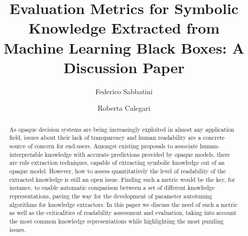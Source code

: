 \documentclass[sigconf]{acmart}
\begin{document}
\title{Evaluation Metrics for Symbolic Knowledge Extracted from Machine Learning Black Boxes: A Discussion Paper}

\author{Federico Sabbatini}

\author{Roberta Calegari}

\renewcommand{\shortauthors}{F. Sabbatini, R. Calegari}

\begin{abstract}
  As opaque decision systems are being increasingly exploited in almost any application field, issues about their lack of transparency and human readability are a concrete source of concern for end-users.
  Amongst existing proposals to associate human-interpretable knowledge with accurate predictions provided by opaque models, there are rule extraction techniques, capable of extracting symbolic knowledge out of an opaque model.
  However, how to assess quantitatively the level of readability of the extracted knowledge is still an open issue.
  Finding such a metric would be the key, for instance, to enable automatic comparison between a set of different knowledge representations, paving the way for the development of parameter autotuning algorithms for knowledge extractors.
  In this paper we discuss the need of such a metric as well as the criticalities of readability assessment and evaluation, taking into account the most common knowledge representations while highlighting the most puzzling issues.
\end{abstract}
\end{document}
